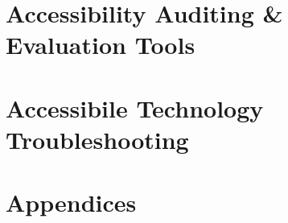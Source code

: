 \documentclass[12pt,letterpaper,twoside]{report}
\begin{document}
\part{Accessibility Auditing \& Evaluation Tools}



\part{Accessibile Technology Troubleshooting}





\part{Appendices}


\end{document}
